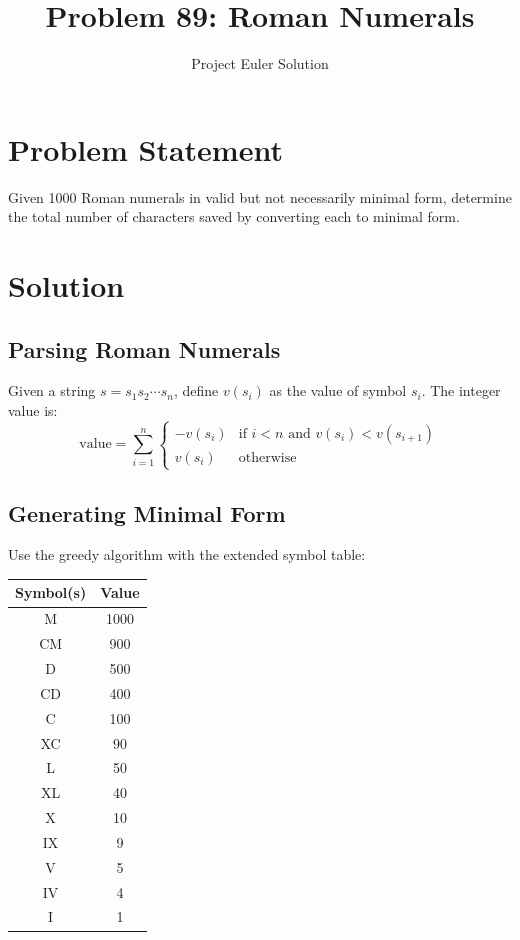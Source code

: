 \documentclass[12pt,a4paper]{article}
\title{Problem 89: Roman Numerals}
\author{Project Euler Solution}
\date{}
\theoremstyle{definition}
\begin{document}
\maketitle

\section{Problem Statement}
Given 1000 Roman numerals in valid but not necessarily minimal form, determine the total number of characters saved by converting each to minimal form.

\section{Solution}

\subsection{Parsing Roman Numerals}
Given a string $s = s_1 s_2 \cdots s_n$, define $v(s_i)$ as the value of symbol $s_i$. The integer value is:
\[
\text{value} = \sum_{i=1}^{n} \begin{cases} -v(s_i) & \text{if } i < n \text{ and } v(s_i) < v(s_{i+1}) \\ v(s_i) & \text{otherwise} \end{cases}
\]

\subsection{Generating Minimal Form}
Use the greedy algorithm with the extended symbol table:

\begin{center}
\begin{tabular}{cc}
\toprule
\textbf{Symbol(s)} & \textbf{Value} \\
\midrule
M & 1000 \\
CM & 900 \\
D & 500 \\
CD & 400 \\
C & 100 \\
XC & 90 \\
L & 50 \\
XL & 40 \\
X & 10 \\
IX & 9 \\
V & 5 \\
IV & 4 \\
I & 1 \\
\bottomrule
\end{tabular}
\end{center}
\end{document}
